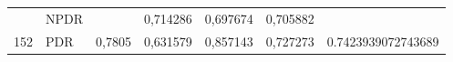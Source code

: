 \begin{table}[hbtp]
\begin{center}
\begin{tabular}{|c|l|c|l|l|l|c|}
                                  & NPDR                                               &                          & 0,714286                                          & 0,697674                                         & 0,705882                                        &                                      \\ \cline{2-2} \cline{4-6}
            \multirow{-3}{*}{152} & PDR                                                & \multirow{-3}{*}{0,7805} & 0,631579                                          & 0,857143                                         & 0,727273                                        & \multirow{-3}{*}{0.7423939072743689} \\ \hline
            \end{tabular}
        \end{center}
    \end{table}
